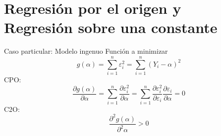 \section{Regresión por el origen y Regresión sobre una constante}
\begin{frame}{Caso particular: Modelo ingenuo}
	Función a minimizar
	$$g(\alpha)=\sum_{i=1}^n \varepsilon _i ^2= \sum_{i=1}^n (Y_i-\alpha)^2$$
	CPO:
	$$\frac{\partial g(\alpha)}{\partial \alpha}=\sum_{i=1}^n \frac{\partial \varepsilon _i ^2}{\partial \alpha}=\sum_{i=1}^n \frac{\partial \varepsilon _i ^2}{\partial \varepsilon_i} \frac{\partial \varepsilon_i}{\partial \alpha}=0$$
	C2O:
	$$\frac{\partial^2 g(\alpha)}{\partial^2 \alpha}>0$$
\end{frame}
